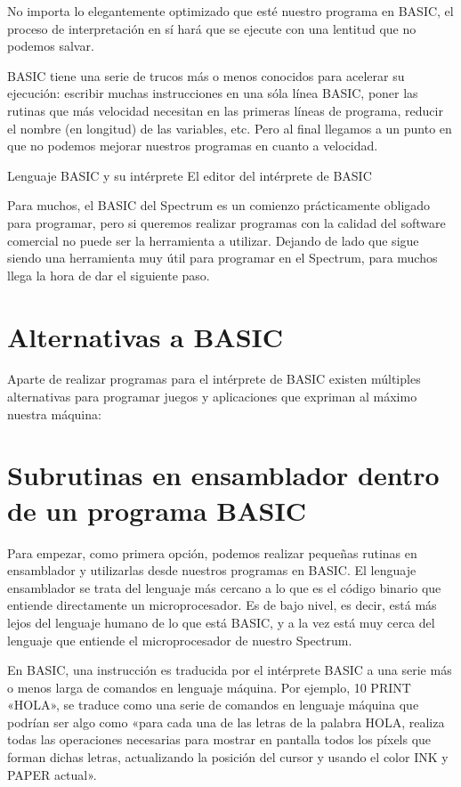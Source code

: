 \documentclass[letterpaper,10pt,spanish]{sphinxmanual}
\begin{document}
No importa lo elegantemente optimizado que esté nuestro programa en BASIC, el proceso de interpretación en sí hará que se ejecute con una lentitud que no podemos salvar.

BASIC tiene una serie de trucos más o menos conocidos para acelerar su ejecución: escribir muchas instrucciones en una sóla línea BASIC, poner las rutinas que más velocidad necesitan en las primeras líneas de programa, reducir el nombre (en longitud) de las variables, etc. Pero al final llegamos a un punto en que no podemos mejorar nuestros programas en cuanto a velocidad.

Lenguaje BASIC y su intérprete
El editor del intérprete de BASIC

Para muchos, el BASIC del Spectrum es un comienzo prácticamente obligado para programar, pero si queremos realizar programas con la calidad del software comercial no puede ser la herramienta a utilizar. Dejando de lado que sigue siendo una herramienta muy útil para programar en el Spectrum, para muchos llega la hora de dar el siguiente paso.


\section{Alternativas a BASIC}
\label{\detokenize{02_introduccion/introduccion:alternativas-a-basic}}
Aparte de realizar programas para el intérprete de BASIC existen múltiples alternativas para programar juegos y aplicaciones que expriman al máximo nuestra máquina:


\section{Subrutinas en ensamblador dentro de un programa BASIC}
\label{\detokenize{02_introduccion/introduccion:subrutinas-en-ensamblador-dentro-de-un-programa-basic}}
Para empezar, como primera opción, podemos realizar pequeñas rutinas en ensamblador y utilizarlas desde nuestros programas en BASIC. El lenguaje ensamblador se trata del lenguaje más cercano a lo que es el código binario que entiende directamente un microprocesador. Es de bajo nivel, es decir, está más lejos del lenguaje humano de lo que está BASIC, y a la vez está muy cerca del lenguaje que entiende el microprocesador de nuestro Spectrum.

En BASIC, una instrucción es traducida por el intérprete BASIC a una serie más o menos larga de comandos en lenguaje máquina. Por ejemplo, 10 PRINT «HOLA», se traduce como una serie de comandos en lenguaje máquina que podrían ser algo como «para cada una de las letras de la palabra HOLA, realiza todas las operaciones necesarias para mostrar en pantalla todos los píxels que forman dichas letras, actualizando la posición del cursor y usando el color INK y PAPER actual».
\end{document}
